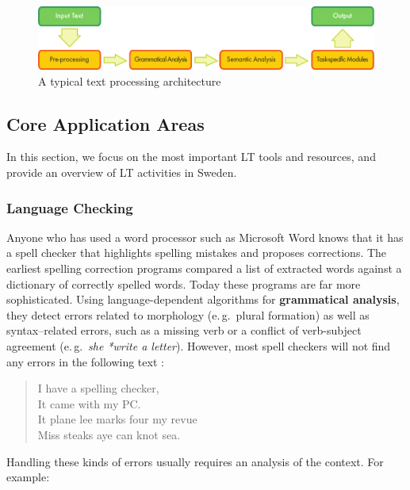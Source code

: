 \begin{multicols}{2}
\begin{figure}[htb]
  \center
  \includegraphics[width=\textwidth]{../_media/english/text_processing_app_architecture}
  \caption{A typical text processing architecture}
  \label{fig:textprocessingarch_en}
\end{figure}

\subsection{Core Application Areas}

In this section, we focus on the most important LT tools and resources, and provide an overview of LT activities in Sweden. 

\subsubsection{Language Checking}

Anyone who has used a word processor such as Microsoft Word knows that
it has a spell checker that highlights spelling mistakes and proposes
corrections. The earliest spelling correction programs compared a list
of extracted words against a dictionary of correctly spelled
words. Today these programs are far more sophisticated. Using
language-dependent algorithms for \textbf{grammatical analysis}, they
detect errors related to morphology (e.\,g.~plural formation) as well
as syntax–related errors, such as a missing verb or a conflict of
verb-subject agreement (e.\,g.~\textit{she *write a
  letter}). However, most spell checkers will not find any errors in
the following text \cite{zar1}:

\begin{quote}
  I have a spelling checker,\\
  It came with my PC.\\ 
  It plane lee marks four my revue\\
  Miss steaks aye can knot sea.
\end{quote}

Handling these kinds of errors usually requires an analysis of the context. For example: 


\end{multicols}
